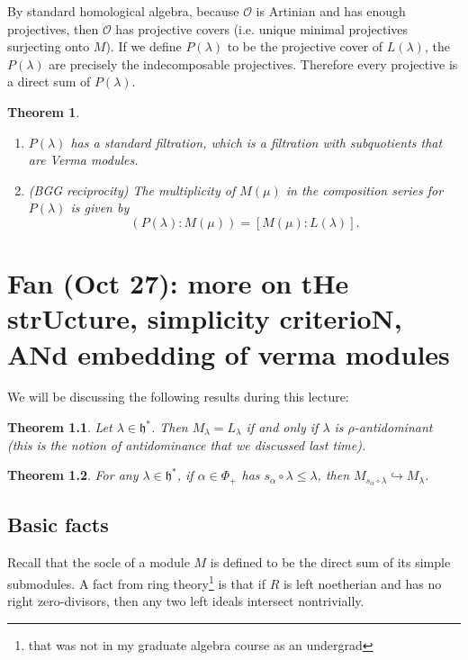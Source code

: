 \documentclass[leqno, openany]{memoir}
\newtheorem{thm}{Theorem}[section]
\theoremstyle{definition}
\theoremstyle{remark}
\theoremstyle{plain}
\theoremstyle{definition}
\theoremstyle{remark}
\newcommand{\cO}{\mathcal{O}}
\newcommand{\h}{\mathfrak{h}}
\begin{document}
By standard homological algebra, because $\cO$ is Artinian and has enough projectives, then $\cO$ has projective covers (i.e. unique minimal projectives surjecting onto $M$). If we define $P(\lambda)$ to be the projective cover of $L(\lambda)$, the $P(\lambda)$ are precisely the indecomposable projectives. Therefore every projective is a direct sum of $P(\lambda)$.

\begin{thm}\leavevmode
    \begin{enumerate}
        \item $P(\lambda)$ has a standard filtration, which is a filtration with subquotients that are Verma modules. 
        \item (BGG reciprocity) The multiplicity of $M(\mu)$ in the composition series for $P(\lambda)$ is given by 
            \[ (P(\lambda):M(\mu)) = [M(\mu):L(\lambda)]. \]
    \end{enumerate}
\end{thm}

\chapter{Fan (Oct 27): more on tHe strUcture, simplicity criterioN, ANd embedding of verma modules}%
\label{cha:fan_oct_27_more_on_the_structure_simplicity_criterion_and_embedding_of_verma_modules}

We will be discussing the following results during this lecture:

\begin{thm}
    Let $\lambda \in \h^*$. Then $M_{\lambda} = L_{\lambda}$ if and only if $\lambda$ is $\rho$-antidominant (this is the notion of antidominance that we discussed last time).
\end{thm}

\begin{thm}
    For any $\lambda \in \h^*$, if $\alpha \in \Phi_+$ has $s_{\alpha} \circ \lambda \leq \lambda$, then $M_{s_{\alpha} \circ \lambda} \hookrightarrow M_{\lambda}$.
\end{thm}

\section{Basic facts}%
\label{sec:basic_facts}

Recall that the socle of a module $M$ is defined to be the direct sum of its simple submodules. A fact from ring theory\footnote{that was not in my graduate algebra course as an undergrad} is that if $R$ is left noetherian and has no right zero-divisors, then any two left ideals intersect nontrivially.
\end{document}
